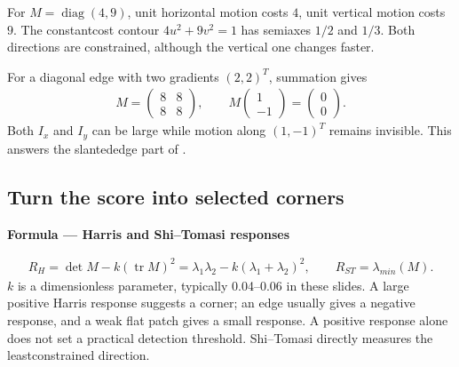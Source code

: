 \documentclass[letterpaper,11pt,english,openany,oneside]{jupyterBook}
\begin{document}
\sphinxAtStartPar
For \(M=\operatorname{diag}(4,9)\), unit horizontal motion costs \(4\), unit vertical motion costs \(9\). The constant\sphinxhyphen{}cost contour \(4u^2+9v^2=1\) has semiaxes \(1/2\) and \(1/3\). Both directions are constrained, although the vertical one changes faster.

\sphinxAtStartPar
For a diagonal edge with two gradients \((2,2)^T\), summation gives
\begin{equation*}
\begin{split}M=\begin{pmatrix}8&8\\8&8\end{pmatrix},\qquad
M\begin{pmatrix}1\\-1\end{pmatrix}=\begin{pmatrix}0\\0\end{pmatrix}.\end{split}
\end{equation*}
\sphinxAtStartPar
Both \(I_x\) and \(I_y\) can be large while motion along \((1,-1)^T\) remains invisible. This answers the slanted\sphinxhyphen{}edge part of {\hyperref[\detokenize{lectures/lecture05/quiz-workbook:quiz-13-q1}]{}}.


\subsection{Turn the score into selected corners}
\label{\detokenize{lectures/lecture05/corners:turn-the-score-into-selected-corners}}
\begin{TextbookBox}
\textbf{Formula — Harris and Shi–Tomasi responses}\par\smallskip
\begin{equation}\label{equation:lectures/lecture05/corners:eq-lec05-harris}
\begin{split}R_H=\det M-k(\operatorname{tr}M)^2
=\lambda_1\lambda_2-k(\lambda_1+\lambda_2)^2,
\qquad R_{ST}=\lambda_{min}(M).\end{split}
\end{equation}
\sphinxAtStartPar
\(k\) is a dimensionless parameter, typically 0.04–0.06 in these slides. A large positive Harris response suggests a corner; an edge usually gives a negative response, and a weak flat patch gives a small response. A positive response alone does not set a practical detection threshold. Shi–Tomasi directly measures the least\sphinxhyphen{}constrained direction.

\end{TextbookBox}
\end{document}
